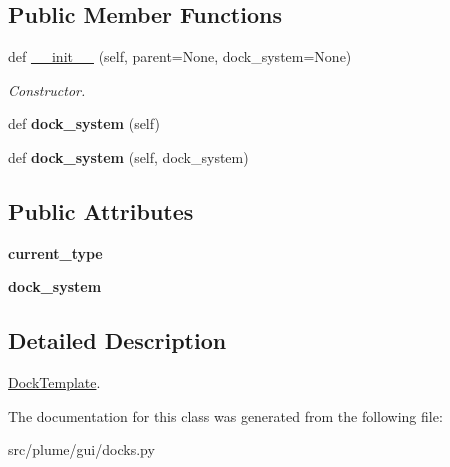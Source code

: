 \subsection*{Public Member Functions}
\begin{DoxyCompactItemize}
\item 
def \hyperlink{classplume-creator_1_1src_1_1plume_1_1gui_1_1docks_1_1_dock_template_a92b10559aa773905f9d81f2377dcf77d}{\+\_\+\+\_\+init\+\_\+\+\_\+} (self, parent=None, dock\+\_\+system=None)\hypertarget{classplume-creator_1_1src_1_1plume_1_1gui_1_1docks_1_1_dock_template_a92b10559aa773905f9d81f2377dcf77d}{}\label{classplume-creator_1_1src_1_1plume_1_1gui_1_1docks_1_1_dock_template_a92b10559aa773905f9d81f2377dcf77d}

\begin{DoxyCompactList}\small\item\em Constructor. \end{DoxyCompactList}\item 
def {\bfseries dock\+\_\+system} (self)\hypertarget{classplume-creator_1_1src_1_1plume_1_1gui_1_1docks_1_1_dock_template_a7c205f62c21c2ae139de651e634ad51c}{}\label{classplume-creator_1_1src_1_1plume_1_1gui_1_1docks_1_1_dock_template_a7c205f62c21c2ae139de651e634ad51c}

\item 
def {\bfseries dock\+\_\+system} (self, dock\+\_\+system)\hypertarget{classplume-creator_1_1src_1_1plume_1_1gui_1_1docks_1_1_dock_template_a2eeec4dc025f4120ac655db6c6f626ea}{}\label{classplume-creator_1_1src_1_1plume_1_1gui_1_1docks_1_1_dock_template_a2eeec4dc025f4120ac655db6c6f626ea}

\end{DoxyCompactItemize}
\subsection*{Public Attributes}
\begin{DoxyCompactItemize}
\item 
{\bfseries current\+\_\+type}\hypertarget{classplume-creator_1_1src_1_1plume_1_1gui_1_1docks_1_1_dock_template_aa6d145f117a034cc5314bc81c8ab54d3}{}\label{classplume-creator_1_1src_1_1plume_1_1gui_1_1docks_1_1_dock_template_aa6d145f117a034cc5314bc81c8ab54d3}

\item 
{\bfseries dock\+\_\+system}\hypertarget{classplume-creator_1_1src_1_1plume_1_1gui_1_1docks_1_1_dock_template_a23b5e787158aadde45ef5465fd30a0a8}{}\label{classplume-creator_1_1src_1_1plume_1_1gui_1_1docks_1_1_dock_template_a23b5e787158aadde45ef5465fd30a0a8}

\end{DoxyCompactItemize}


\subsection{Detailed Description}
\hyperlink{classplume-creator_1_1src_1_1plume_1_1gui_1_1docks_1_1_dock_template}{Dock\+Template}. 

The documentation for this class was generated from the following file\+:\begin{DoxyCompactItemize}
\item 
src/plume/gui/docks.\+py\end{DoxyCompactItemize}
